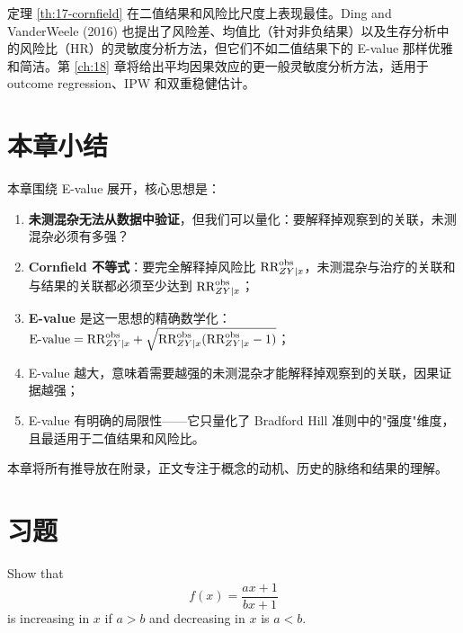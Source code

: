 定理 \ref{th:17-cornfield} 在二值结果和风险比尺度上表现最佳。Ding and VanderWeele (2016) 也提出了风险差、均值比（针对非负结果）以及生存分析中的风险比（HR）的灵敏度分析方法，但它们不如二值结果下的 E-value 那样优雅和简洁。第 \ref{ch:18} 章将给出平均因果效应的更一般灵敏度分析方法，适用于 outcome regression、IPW 和双重稳健估计。

\section{本章小结}\label{sec:17-summary}

本章围绕 E-value 展开，核心思想是：

\begin{enumerate}
  \item \textbf{未测混杂无法从数据中验证}，但我们可以量化：要解释掉观察到的关联，未测混杂必须有多强？
  \item \textbf{Cornfield 不等式}：要完全解释掉风险比 $\text{RR}_{ZY\mid x}^{\mathrm{obs}}$，未测混杂与治疗的关联和与结果的关联都必须至少达到 $\text{RR}_{ZY\mid x}^{\mathrm{obs}}$；
  \item \textbf{E-value} 是这一思想的精确数学化：$\mathrm{E\text{-}value} = \text{RR}_{ZY\mid x}^{\mathrm{obs}} + \sqrt{\text{RR}_{ZY\mid x}^{\mathrm{obs}}(\text{RR}_{ZY\mid x}^{\mathrm{obs}} - 1)}$；
  \item E-value 越大，意味着需要越强的未测混杂才能解释掉观察到的关联，因果证据越强；
  \item E-value 有明确的局限性——它只量化了 Bradford Hill 准则中的"强度"维度，且最适用于二值结果和风险比。
\end{enumerate}

本章将所有推导放在附录，正文专注于概念的动机、历史的脉络和结果的理解。

\section{习题}\label{sec:17-homework}

\begin{HomeworkProblem}\label{exr:17-1}

Show that
\[
f(x) = \frac{ax+1}{bx+1}
\]
is increasing in $x$ if $a>b$ and decreasing in $x$ is $a<b$.


\end{HomeworkProblem}

